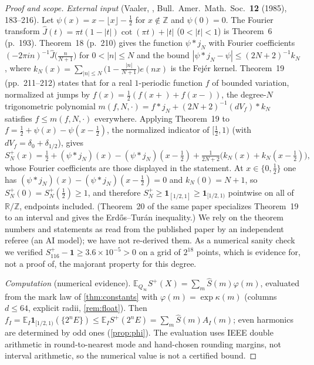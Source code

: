 \documentclass[11pt]{article}
\newcommand{\Ex}{\mathbb E}
\newcommand{\Av}{\mathbb E}
\newcommand{\ind}{\mathbf 1}
\newcommand{\Qinf}{{Q_\infty}}
\begin{document}
\begin{proof}[Proof and scope]
\emph{External input} (Vaaler, \cite{vaaler1985}, Bull.\ Amer.\ Math.\ Soc.\ \textbf{12} (1985), 183--216). Let $\psi(x)=x-\lfloor x\rfloor-\tfrac12$ for $x\notin\mathbb Z$ and $\psi(0)=0$. The Fourier transform $\hat J(t)=\pi t(1-|t|)\cot(\pi t)+|t|$ ($0<|t|<1$) is Theorem~6 (p.~193). Theorem~18 (p.~210) gives the function $\psi*j_N$ with Fourier coefficients $(-2\pi in)^{-1}\hat J\bigl(\tfrac n{N+1}\bigr)$ for $0<|n|\le N$ and the bound $|\psi*j_N-\psi|\le(2N+2)^{-1}k_N$, where $k_N(x)=\sum_{|n|\le N}\bigl(1-\tfrac{|n|}{N+1}\bigr)e(nx)$ is the Fej\'er kernel. Theorem~19 (pp.~211--212) states that for a real $1$-periodic function $f$ of bounded variation, normalized at jumps by $f(x)=\tfrac12(f(x+)+f(x-))$, the degree-$N$ trigonometric polynomial $m(f,N,\cdot)=f*j_N+(2N+2)^{-1}(dV_f)*k_N$ satisfies $f\le m(f,N,\cdot)$ everywhere. Applying Theorem~19 to $f=\tfrac12+\psi(x)-\psi(x-\tfrac12)$, the normalized indicator of $[\tfrac12,1)$ (with $dV_f=\delta_0+\delta_{1/2}$), gives
\[
S^+_N(x)=\tfrac12+(\psi*j_N)(x)-(\psi*j_N)(x-\tfrac12)+\tfrac1{2N+2}\bigl(k_N(x)+k_N(x-\tfrac12)\bigr),
\]
whose Fourier coefficients are those displayed in the statement. At $x\in\{0,\tfrac12\}$ one has $(\psi*j_N)(x)-(\psi*j_N)(x-\tfrac12)=0$ and $k_N(0)=N+1$, so $S^+_N(0)=S^+_N(\tfrac12)\ge1$, and therefore $S^+_N\ge\ind_{[1/2,1]}\ge\ind_{[1/2,1)}$ pointwise on all of $\mathbb R/\mathbb Z$, endpoints included. (Theorem~20 of the same paper specializes Theorem~19 to an interval and gives the Erd\H{o}s--Tur\'an inequality.) We rely on the theorem numbers and statements as read from the published paper by an independent referee (an AI model); we have not re-derived them. As a numerical sanity check we verified $S^+_{116}-\ind\ge3.6\times10^{-5}>0$ on a grid of $2^{18}$ points, which is evidence for, not a proof of, the majorant property for this degree.

\emph{Computation} (numerical evidence). $\Ex_\Qinf S^+(X)=\sum_m\hat S(m)\varphi(m)$, evaluated from the mark law of \cref{thm:constants} with $\varphi(m)=\exp\kappa(m)$ (columns $d\le64$, explicit radii, \cref{rem:float}). Then $f_I=\Av_I\ind_{[1/2,1)}(\{2^nE\})\le\Av_IS^+(2^nE)=\sum_m\hat S(m)A_I(m)$; even harmonics are determined by odd ones (\cref{prop:phi}). The evaluation uses IEEE double arithmetic in round-to-nearest mode and hand-chosen rounding margins, not interval arithmetic, so the numerical value is not a certified bound.
\end{proof}
\end{document}
